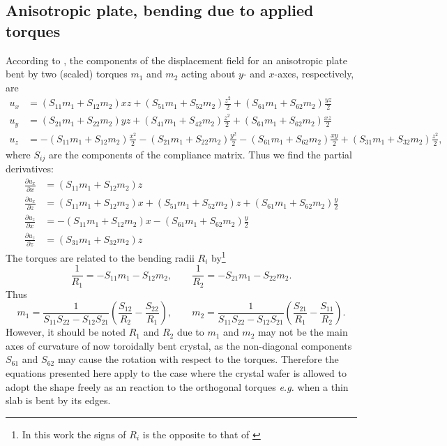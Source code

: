 \documentclass[11pt,a4paper]{article}
\begin{document}
\subsection{Anisotropic plate, bending due to applied torques}
According to \cite{Chukhovskii_1994}, the components of the displacement field for an anisotropic plate bent by two (scaled) torques $m_1$ and $m_2$ acting about $y$- and $x$-axes, respectively, are
\begin{align}
u_x &= (S_{11} m_1 + S_{12} m_2) x z + (S_{51} m_1 + S_{52} m_2)\frac{z^2}{2} + (S_{61} m_1 +S_{62} m_2) \frac{y z}{2} \\
u_y &= (S_{21} m_1 + S_{22} m_2) y z + (S_{41} m_1 + S_{42} m_2)\frac{z^2}{2} + (S_{61} m_1 +S_{62} m_2) \frac{x z}{2} \\
u_z &= -(S_{11} m_1 + S_{12} m_2)\frac{x^2}{2} -(S_{21} m_1 + S_{22} m_2)\frac{y^2}{2} -(S_{61} m_1 +S_{62} m_2) \frac{x y}{2} +(S_{31} m_1 + S_{32} m_2)\frac{z^2}{2},
\end{align} 
where $S_{ij}$ are the components of the compliance matrix. Thus we find the partial derivatives:
\begin{align}
\frac{\partial u_x}{\partial x} &= (S_{11} m_1 + S_{12} m_2) z \\
\frac{\partial u_x}{\partial z} &= (S_{11} m_1 + S_{12} m_2) x + (S_{51} m_1 + S_{52} m_2) z 
+ (S_{61} m_1 + S_{62} m_2) \frac{y}{2}\\
\frac{\partial u_z}{\partial x} &= -(S_{11} m_1 + S_{12} m_2) x -(S_{61} m_1 + S_{62} m_2) \frac{y}{2} \\
\frac{\partial u_z}{\partial z} &= (S_{31} m_1 + S_{32} m_2) z
\end{align} 
The torques are related to the bending radii $R_i$ by\footnote{In this work the signs of $R_i$ is the opposite to that of \cite{Chukhovskii_1994}}
\begin{equation}
\frac{1}{R_1} = -S_{11} m_1 - S_{12} m_2, \qquad
\frac{1}{R_2} = -S_{21} m_1 - S_{22} m_2.
\end{equation}
Thus
\begin{equation}
m_1 = \frac{1}{S_{11}S_{22}-S_{12}S_{21}}\left(\frac{S_{12}}{R_2}-\frac{S_{22}}{R_1} \right), \qquad
m_2 = \frac{1}{S_{11}S_{22}-S_{12}S_{21}}\left(\frac{S_{21}}{R_1}-\frac{S_{11}}{R_2} \right).
\label{eq:ms}
\end{equation}
However, it should be noted $R_1$ and $R_2$ due to $m_1$ and $m_2$ may not be the main axes of curvature of now toroidally bent crystal, as the non-diagonal components $S_{61}$ and $S_{62}$ may cause the rotation with respect to the torques. Therefore the equations presented here apply to the case where the crystal wafer is allowed to adopt the shape freely as an reaction to the orthogonal torques \emph{e.g.} when a thin slab is bent by its edges.
\end{document}
